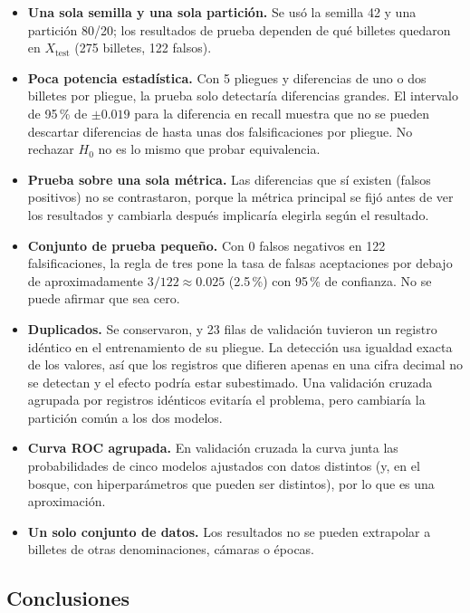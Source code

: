 \documentclass[conference]{IEEEtran}
\begin{document}
	\begin{itemize}
		\item \textbf{Una sola semilla y una sola partición.} Se usó la semilla 42 y una partición 80/20; los resultados de prueba dependen de qué billetes quedaron en $X_{\text{test}}$ (275 billetes, 122 falsos).
		\item \textbf{Poca potencia estadística.} Con 5 pliegues y diferencias de uno o dos billetes por pliegue, la prueba solo detectaría diferencias grandes. El intervalo de 95\,\% de $\pm0.019$ para la diferencia en recall muestra que no se pueden descartar diferencias de hasta unas dos falsificaciones por pliegue. No rechazar $H_0$ no es lo mismo que probar equivalencia.
		\item \textbf{Prueba sobre una sola métrica.} Las diferencias que sí existen (falsos positivos) no se contrastaron, porque la métrica principal se fijó antes de ver los resultados y cambiarla después implicaría elegirla según el resultado.
		\item \textbf{Conjunto de prueba pequeño.} Con 0 falsos negativos en 122 falsificaciones, la regla de tres pone la tasa de falsas aceptaciones por debajo de aproximadamente $3/122\approx 0.025$ (2.5\,\%) con 95\,\% de confianza. No se puede afirmar que sea cero.
		\item \textbf{Duplicados.} Se conservaron, y 23 filas de validación tuvieron un registro idéntico en el entrenamiento de su pliegue. La detección usa igualdad exacta de los valores, así que los registros que difieren apenas en una cifra decimal no se detectan y el efecto podría estar subestimado. Una validación cruzada agrupada por registros idénticos evitaría el problema, pero cambiaría la partición común a los dos modelos.
		\item \textbf{Curva ROC agrupada.} En validación cruzada la curva junta las probabilidades de cinco modelos ajustados con datos distintos (y, en el bosque, con hiperparámetros que pueden ser distintos), por lo que es una aproximación.
		\item \textbf{Un solo conjunto de datos.} Los resultados no se pueden extrapolar a billetes de otras denominaciones, cámaras o épocas.
	\end{itemize}
	
	\subsection{Conclusiones}
	
\end{document}
